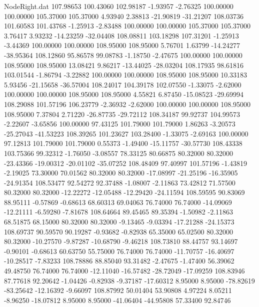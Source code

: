 \begin{filecontents}{NodeRight.dat}
 107.98653  100.43060  102.98187    -1.93957   -2.76325  100.00000  100.00000  105.37000  105.37000    4.93940    2.38813  -21.90819  -31.21207
 108.03736  101.60583  101.43768    -1.25913   -2.83488  100.00000  100.00000  105.37000  105.37000    3.76417    3.93232  -14.23259  -32.04408
 108.08811  103.18298  107.31201    -1.25913   -3.44369  100.00000  100.00000  108.95000  108.95000    5.76701    1.63799  -14.24277  -38.95364
 108.12860   95.86578   99.08783    -1.18750   -2.47675  100.00000  100.00000  108.95000  108.95000   13.08421    9.86217  -13.44025  -28.03204
 108.17935   98.61816  103.01544    -1.86794   -3.22882  100.00000  100.00000  108.95000  108.95000   10.33183    5.93456  -21.15658  -36.57004
 108.24017  104.39178  102.07550    -1.33075   -2.62000  100.00000  100.00000  108.95000  108.95000    4.55821    6.87450  -15.08523  -29.69994
 108.29088  101.57196  106.23779    -2.36932   -2.62000  100.00000  100.00000  108.95000  108.95000    7.37804    2.71220  -26.87735  -29.72112
 108.34187   99.92737  104.99573    -2.22607   -3.65856  100.00000   97.43125  101.79000  101.79000    1.86263   -3.20573  -25.27043  -41.53223
 108.39265  101.23627  103.28400    -1.33075   -2.69163  100.00000   97.12813  101.79000  101.79000    0.55373   -1.49400  -15.11757  -30.57730
 108.43338  103.75366   99.32312    -1.76050   -3.08557   78.33125   80.66875   80.32000   80.32000  -23.43366  -19.00312  -20.01102  -35.07252
 108.48409   97.40997  101.57196    -1.43819   -2.19025   73.30000   70.01562   80.32000   80.32000  -17.08997  -21.25196  -16.35905  -24.91354
 108.53477   92.54272   92.37488    -1.08007   -2.11863   73.42812   71.57500   80.32000   80.32000  -12.22272  -12.05488  -12.29420  -24.11594
 108.59595   90.83069   88.95111    -0.57869   -0.68613   68.60313   69.04063   76.74000   76.74000  -14.09069  -12.21111   -6.59280   -7.81678
 108.64664   89.45465   89.35394    -1.50982   -2.11863   68.51875   68.15000   80.32000   80.32000   -9.13465   -9.03394  -17.21288  -24.15373
 108.69737   90.59570   90.19287    -0.93682   -0.82938   65.35000   65.02500   80.32000   80.32000  -10.27570   -9.87287  -10.68790   -9.46218
 108.73810   88.44757   93.14697    -0.90101   -0.68613   60.63750   55.75000   76.74000   76.74000  -11.70757  -16.40697  -10.28517   -7.83233
 108.78886   88.85040   93.31482    -2.47675   -1.47400   56.39062   49.48750   76.74000   76.74000  -12.11040  -16.57482  -28.72049  -17.09259
 108.83946   87.77618   92.20642    -1.04426   -0.82938   -9.37187  -17.60312    8.95000    8.95000  -78.82619  -83.25642  -12.16392   -9.66097
 108.87992   50.01404   53.90808     4.97224    8.05211   -8.96250  -18.07812    8.95000    8.95000  -41.06404  -44.95808   57.33400   92.84746

\end{filecontents}
